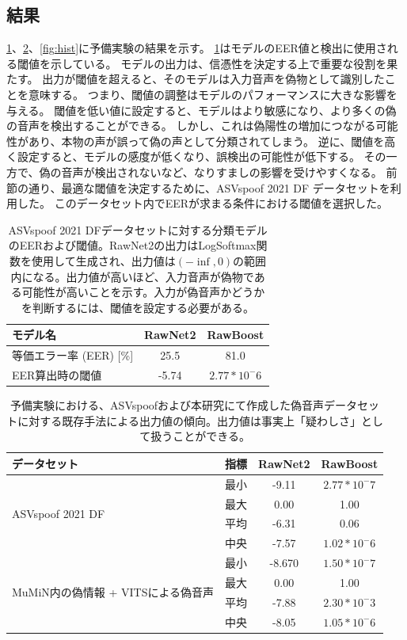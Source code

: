 \subsection{結果}
\cref{tab:eer}、\cref{tab:preOut}、\cref{fig:hist}に予備実験の結果を示す。
\cref{tab:eer}はモデルのEER値と検出に使用される閾値を示している。
モデルの出力は、信憑性を決定する上で重要な役割を果たす。
出力が閾値を超えると、そのモデルは入力音声を偽物として識別したことを意味する。
つまり、閾値の調整はモデルのパフォーマンスに大きな影響を与える。
閾値を低い値に設定すると、モデルはより敏感になり、より多くの偽の音声を検出することができる。
しかし、これは偽陽性の増加につながる可能性があり、本物の声が誤って偽の声として分類されてしまう。
逆に、閾値を高く設定すると、モデルの感度が低くなり、誤検出の可能性が低下する。
その一方で、偽の音声が検出されないなど、なりすましの影響を受けやすくなる。
前節の通り、最適な閾値を決定するために、ASVspoof 2021 DF データセットを利用した。
このデータセット内でEERが求まる条件における閾値を選択した。

\begin{table}[p]
    \centering
    \begin{tabular}{lcc}\hline
        モデル名 & RawNet2 & RawBoost \\ \hline \hline
        等価エラー率 (EER) [\%] & 25.5 & 81.0 \\
        EER算出時の閾値 & -5.74 & $2.77 * 10^-6$ \\ \hline
    \end{tabular}
    \caption{ASVspoof 2021 DFデータセットに対する分類モデルのEERおよび閾値。RawNet2の出力はLogSoftmax関数を使用して生成され、出力値は$(-\inf,0)$の範囲内になる。出力値が高いほど、入力音声が偽物である可能性が高いことを示す。入力が偽音声かどうかを判断するには、閾値を設定する必要がある。}
    \label{tab:eer}
\end{table}

\begin{table}[p]
    \centering
    \begin{tabular}{lccc} \hline
        データセット & 指標 & RawNet2 & RawBoost \\\hline \hline
         & 最小 & -9.11 & $2.77 * 10^-7$ \\
        \multirow{2}{*}{ASVspoof 2021 DF} & 最大 & 0.00 & 1.00 \\
         & 平均 & -6.31 & 0.06 \\
         & 中央 & -7.57 & $1.02 * 10^-6$ \\ \hline
         & 最小 & -8.670 & $1.50 * 10^-7$ \\
         \multirow{2}{*}{MuMiN内の偽情報 + VITSによる偽音声}& 最大 & 0.00 & 1.00 \\
         & 平均 & -7.88 & $2.30 * 10^-3$ \\
         & 中央 & -8.05 & $1.05 * 10^-6$ \\ \hline
    \end{tabular}
    \caption{予備実験における、ASVspoofおよび本研究にて作成した偽音声データセットに対する既存手法による出力値の傾向。出力値は事実上「疑わしさ」として扱うことができる。}
    \label{tab:preOut}
\end{table}

